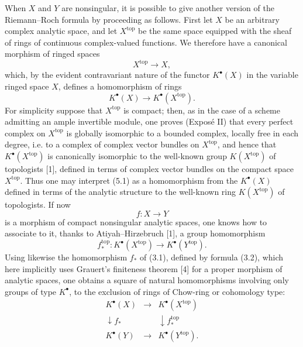 \documentclass[11pt]{article}
\begin{document}
When $X$ and $Y$ are nonsingular, it is possible to give another version of the Riemann--Roch formula by proceeding as follows. First let $X$ be an arbitrary complex analytic space, and let $X^{\mathrm{top}}$ be the same space equipped with the sheaf of rings of continuous complex-valued functions. We therefore have a canonical morphism of ringed spaces
\[
X^{\mathrm{top}}\longrightarrow X,
\]
which, by the evident contravariant nature of the functor $K^\bullet(X)$ in the variable ringed space $X$, defines a homomorphism of rings
\begin{equation}\tag{5.1}
K^\bullet(X)\longrightarrow K^\bullet(X^{\mathrm{top}}).
\end{equation}
For simplicity suppose that $X^{\mathrm{top}}$ is compact; then, as in the case of a scheme admitting an ample invertible module, one proves (Expos\'e II) that every perfect complex on $X^{\mathrm{top}}$ is globally isomorphic to a bounded complex, locally free in each degree, i.e. to a complex of complex vector bundles on $X^{\mathrm{top}}$, and hence that $K^\bullet(X^{\mathrm{top}})$ is canonically isomorphic to the well-known group $K(X^{\mathrm{top}})$ of topologists [1], defined in terms of complex vector bundles on the compact space $X^{\mathrm{top}}$. Thus one may interpret (5.1) as a homomorphism from the $K^\bullet(X)$ defined in terms of the analytic structure to the well-known ring $K(X^{\mathrm{top}})$ of topologists. If now
\[
f:X\longrightarrow Y
\]
is a morphism of compact nonsingular analytic spaces, one knows how to associate to it, thanks to Atiyah--Hirzebruch [1], a group homomorphism
\begin{equation}\tag{5.2}
f^{\mathrm{top}}_*:K^\bullet(X^{\mathrm{top}})\longrightarrow K^\bullet(Y^{\mathrm{top}}).
\end{equation}
Using likewise the homomorphism $f_*$ of (3.1), defined by formula (3.2), which here implicitly uses Grauert's finiteness theorem [4] for a proper morphism of analytic spaces, one obtains a square of natural homomorphisms involving only groups of type $K^\bullet$, to the exclusion of rings of Chow-ring or cohomology type:
\begin{equation}\tag{5.3}
\begin{array}{ccc}
K^\bullet(X) & \longrightarrow & K^\bullet(X^{\mathrm{top}}) \\
\downarrow f_* && \downarrow f^{\mathrm{top}}_* \\
K^\bullet(Y) & \longrightarrow & K^\bullet(Y^{\mathrm{top}}).
\end{array}
\end{equation}
\end{document}
